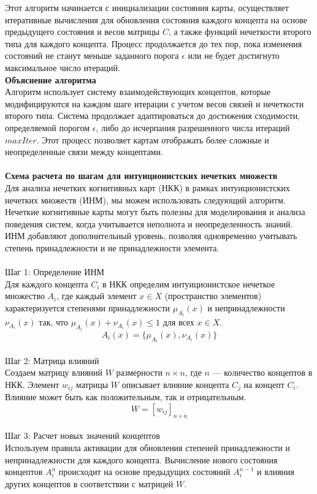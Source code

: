\documentclass{article}
\begin{document}
    Этот алгоритм начинается с инициализации состояния карты, осуществляет итеративные вычисления для обновления состояния каждого концепта на основе предыдущего состояния и весов матрицы $C$, а также функций нечеткости второго типа для каждого концепта. Процесс продолжается до тех пор, пока изменения состояний не станут меньше заданного порога $\epsilon$ или не будет достигнуто максимальное число итераций.
    ~\\
    \textbf{Объяснение алгоритма}\\
    Алгоритм использует систему взаимодействующих концептов, которые модифицируются на каждом шаге итерации с учетом весов связей и нечеткости второго типа. Система продолжает адаптироваться до достижения сходимости, определяемой порогом $\epsilon$, либо до исчерпания разрешенного числа итераций $maxIter$. Этот процесс позволяет картам отображать более сложные и неопределенные связи между концептами.\\
    ~\\
    \textbf{Схема расчета по шагам для интуиционистских нечетких множеств}\\
    Для анализа нечетких когнитивных карт (НКК) в рамках интуиционистских нечетких множеств (ИНМ), мы можем использовать следующий алгоритм. Нечеткие когнитивные карты могут быть полезны для моделирования и анализа поведения систем, когда учитывается неполнота и неопределенность знаний. ИНМ добавляют дополнительный уровень, позволяя одновременно учитывать степень принадлежности и не принадлежности элемента.\\
    ~\\
    Шаг 1: Определение ИНМ\\
    Для каждого концепта $C_i$ в НКК определим интуиционистское нечеткое множество $A_i$, где каждый элемент $x \in X$ (пространство элементов) характеризуется степенями принадлежности $\mu_{A_i}(x)$ и непринадлежности $\nu_{A_i}(x)$ так, что $\mu_{A_i}(x) + \nu_{A_i}(x) \leq 1$ для всех $x \in X$.\\

    $$A_i(x) = \{\mu_{A_i}(x), \nu_{A_i}(x)\}$$
    ~\\
    Шаг 2: Матрица влияний\\
    Создаем матрицу влияний $W$ размерности $n \times n$, где $n$ — количество концептов в НКК. Элемент $w_{ij}$ матрицы $W$ описывает влияние концепта $C_j$ на концепт $C_i$. Влияние может быть как положительным, так и отрицательным.\\

    $$W = [w_{ij}]_{n \times n}$$
    ~\\
    Шаг 3: Расчет новых значений концептов\\
    Используем правила активации для обновления степеней принадлежности и непринадлежности для каждого концепта. Вычисление нового состояния концептов $A_i^n$ происходит на основе предыдущих состояний $A_i^{n-1}$ и влияния других концептов в соответствии с матрицей $W$.\\
\end{document}
